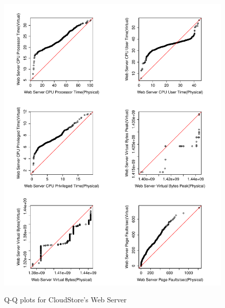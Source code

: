 \begin{figure}[tbh]
	\centering
	{\includegraphics[width=1.0\textwidth]{figures/appendix/qq_plots/CloudStore/Web_Server/First_six.pdf}}
	\caption{Q-Q plots for CloudStore's Web Server}
\end{figure}

